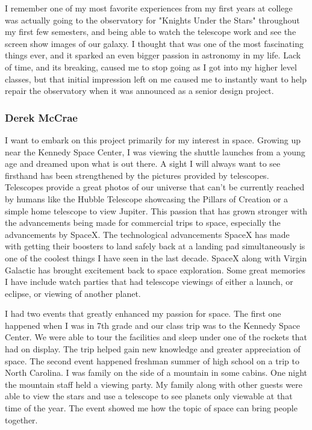 \documentclass[12pt]{article}
\begin{document}
I remember one of my most favorite experiences from my first years at college was actually going to the observatory for "Knights Under the Stars" throughout my first few semesters, and being able to watch the telescope work and see the screen show images of our galaxy. I thought that was one of the most fascinating things ever, and it sparked an even bigger passion in astronomy in my life. Lack of time, and its breaking, caused me to stop going as I got into my higher level classes, but that initial impression left on me caused me to instantly want to help repair the observatory when it was announced as a senior design project.

\subsubsection{Derek McCrae}

I want to embark on this project primarily for my interest in space. Growing up near the Kennedy Space Center, I was viewing the shuttle launches from a young age and dreamed upon what is out there. A sight I will always want to see firsthand has been strengthened by the pictures provided by telescopes. Telescopes provide a great photos of our universe that can't be currently reached by humans like the Hubble Telescope showcasing the Pillars of Creation or a simple home telescope to view Jupiter. This passion that has grown stronger with the advancements being made for commercial trips to space, especially the advancements by SpaceX. The technological advancements SpaceX has made with getting their boosters to land safely back at a landing pad simultaneously is one of the coolest things I have seen in the last decade. SpaceX along with Virgin Galactic has brought excitement back to space exploration. Some great memories I have include watch parties that had telescope viewings of either a launch, or eclipse, or viewing of another planet.

I had two events that greatly enhanced my passion for space. The first one happened when I was in 7th grade and our class trip was to the Kennedy Space Center. We were able to tour the facilities and sleep under one of the rockets that had on display. The trip helped gain new knowledge and greater appreciation of space. The second event happened freshman summer of high school on a trip to North Carolina. I was family on the side of a mountain in some cabins. One night the mountain staff held a viewing party. My family along with other guests were able to view the stars and use a telescope to see planets only viewable at that time of the year. The event showed me how the topic of space can bring people together.
\end{document}
